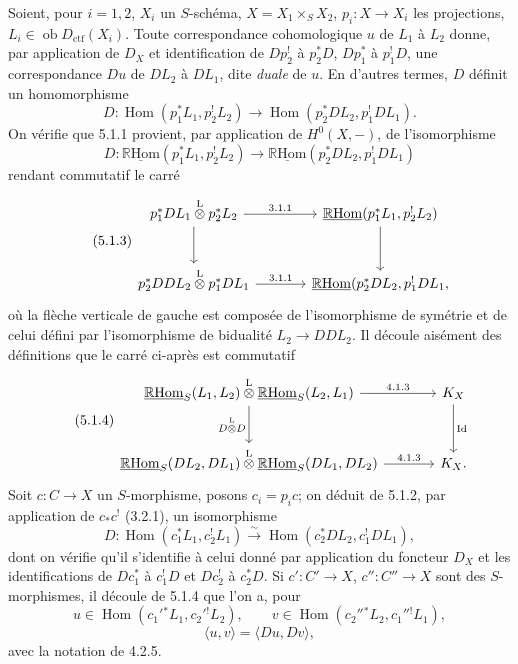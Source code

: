 \documentclass[11pt]{article}
\DeclareMathOperator{\Hom}{Hom}
\newcommand{\R}{\mathbb{R}}\newcommand{\RHomCore}{\mathbb{R}\mathrm{Hom}}
\providecommand{\RHom}{\RHomCore}
\providecommand{\uRHom}{\underline{\RHom}}
\providecommand{\RHom}{\RHomCore}
\providecommand{\Hom}{\operatorname{Hom}}
\providecommand{\RHom}{\R\mathcal{H}om}
\providecommand{\R}{\mathrm R}
\providecommand{\RHom}{\RHomCore}
\providecommand{\Hom}{\operatorname{Hom}}
\begin{document}
Soient, pour $i=1,2$, $X_i$ un $S$-schéma, $X=X_1\times_S X_2$, $p_i:X\to X_i$ les projections, $L_i\in\operatorname{ob}D_{\mathrm{ctf}}(X_i)$. Toute correspondance cohomologique $u$ de $L_1$ à $L_2$ donne, par application de $D_X$ et identification de $Dp_2^!$ à $p_2^*D$, $Dp_1^*$ à $p_1^!D$, une correspondance $Du$ de $DL_2$ à $DL_1$, dite \emph{duale} de $u$. En d'autres termes, $D$ définit un homomorphisme
\begin{equation}
\tag{5.1.1}
D:\Hom(p_1^*L_1,p_2^!L_2)\longrightarrow \Hom(p_2^*DL_2,p_1^!DL_1).
\end{equation}
On vérifie que 5.1.1 provient, par application de $H^0(X,-)$, de l'isomorphisme
\begin{equation}
\tag{5.1.2}
D:\uRHom(p_1^*L_1,p_2^!L_2)\longrightarrow\uRHom(p_2^*DL_2,p_1^!DL_1)
\end{equation}
rendant commutatif le carré
\begin{equation}
\tag{5.1.3}
\begin{tikzcd}[column sep=large,row sep=large]
p_1^*DL_1\overset{\mathrm{L}}{\otimes}p_2^*L_2 \arrow[r,"3.1.1"] \arrow[d]
& \uRHom(p_1^*L_1,p_2^!L_2) \arrow[d] \\
p_2^*DDL_2\overset{\mathrm{L}}{\otimes}p_1^*DL_1 \arrow[r,"3.1.1"]
& \uRHom(p_2^*DL_2,p_1^!DL_1,
\end{tikzcd}
\end{equation}
où la flèche verticale de gauche est composée de l'isomorphisme de symétrie et de celui défini par l'isomorphisme de bidualité $L_2\to DDL_2$. Il découle aisément des définitions que le carré ci-après est commutatif
\begin{equation}
\tag{5.1.4}
\begin{tikzcd}[column sep=large,row sep=large]
\uRHom_S(L_1,L_2)\overset{\mathrm{L}}{\otimes}\uRHom_S(L_2,L_1) \arrow[r,"4.1.3"] \arrow[d,"D\overset{\mathrm{L}}{\otimes} D"']
& K_X \arrow[d,"\operatorname{Id}"] \\
\uRHom_S(DL_2,DL_1)\overset{\mathrm{L}}{\otimes}\uRHom_S(DL_1,DL_2) \arrow[r,"4.1.3"]
& K_X.
\end{tikzcd}
\end{equation}
Soit $c:C\to X$ un $S$-morphisme, posons $c_i=p_ic$; on déduit de 5.1.2, par application de $c_*c^!$ (3.2.1), un isomorphisme
\begin{equation}
\tag{5.1.5}
D:\Hom(c_1^*L_1,c_2^!L_1)\xrightarrow{\sim}\Hom(c_2^*DL_2,c_1^!DL_1),
\end{equation}
dont on vérifie qu'il s'identifie à celui donné par application du foncteur $D_X$ et 
les
identifications de $Dc_1^*$ à $c_1^!D$ et $Dc_2^!$ à $c_2^*D$. Si $c':C'\to X$, $c'':C''\to X$ sont des $S$-morphismes, il découle de 5.1.4 que l'on a, pour
\[
u\in\Hom(c_1'{}^*L_1,c_2'{}^!L_2),\qquad v\in\Hom(c_2''{}^*L_2,c_1''{}^!L_1),\]
\begin{equation}
\tag{5.1.6}
\langle u,v\rangle=\langle Du,Dv\rangle,
\end{equation}
avec la notation de 4.2.5.
\end{document}
